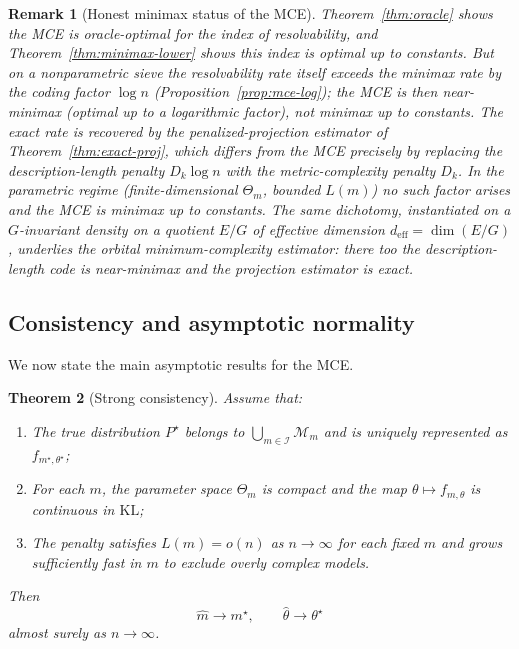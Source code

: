 \documentclass[12pt]{article}
\newtheorem{theorem}{Theorem}[section]
\newtheorem{remark}[theorem]{Remark}
\numberwithin{equation}{section}
\begin{document}
	\begin{remark}[Honest minimax status of the MCE]
		\label{rem:honest-mce}
		Theorem~\ref{thm:oracle} shows the MCE is oracle-optimal \emph{for the index
		of resolvability}, and Theorem~\ref{thm:minimax-lower} shows this index is
		optimal up to constants. But on a nonparametric sieve the resolvability rate
		itself exceeds the minimax rate by the coding factor $\log n$
		(Proposition~\ref{prop:mce-log}); the MCE is then \emph{near-minimax}
		(optimal up to a logarithmic factor), not minimax up to constants. The exact
		rate is recovered by the penalized-projection estimator of
		Theorem~\ref{thm:exact-proj}, which differs from the MCE precisely by
		replacing the description-length penalty $D_k\log n$ with the
		metric-complexity penalty $D_k$. In the \emph{parametric} regime
		(finite-dimensional $\Theta_m$, bounded $L(m)$) no such factor arises and the
		MCE is minimax up to constants. The same dichotomy, instantiated on a
		$G$-invariant density on a quotient $E/G$ of effective dimension
		$d_{\mathrm{eff}}=\dim(E/G)$, underlies the orbital minimum-complexity
		estimator: there too the description-length code is near-minimax and the
		projection estimator is exact.
	\end{remark}

	\subsection{Consistency and asymptotic normality}
	
	We now state the main asymptotic results for the MCE.
	
	\begin{theorem}[Strong consistency]
		\label{thm:consistency}
		Assume that:
		\begin{enumerate}
			\item The true distribution $P^{\star}$ belongs to
			$\bigcup_{m\in\mathcal{I}}\mathcal{M}_m$ and is uniquely represented
			as $f_{m^{\star},\theta^{\star}}$;
			\item For each $m$, the parameter space $\Theta_m$ is compact and
			the map $\theta\mapsto f_{m,\theta}$ is continuous in
			$\mathrm{KL}$;
			\item The penalty satisfies $L(m) = o(n)$ as $n\to\infty$ for each
			fixed $m$ and grows sufficiently fast in $m$ to exclude overly
			complex models.
		\end{enumerate}
		Then
		\[
		\widehat{m}\to m^{\star},\qquad
		\widehat{\theta}\to\theta^{\star}
		\]
		almost surely as $n\to\infty$.
	\end{theorem}
	
\end{document}
